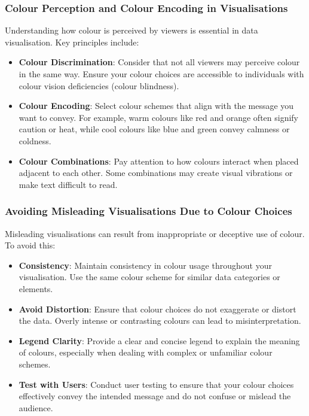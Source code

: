 \documentclass{article}\usepackage[]{graphicx}\usepackage[]{xcolor}
\begin{document}
\subsubsection{Colour Perception and Colour Encoding in Visualisations}
Understanding how colour is perceived by viewers is essential in data visualisation. Key principles include:
\begin{itemize}
    \item \textbf{Colour Discrimination}: Consider that not all viewers may perceive colour in the same way. Ensure your colour choices are accessible to individuals with colour vision deficiencies (colour blindness).
    \item \textbf{Colour Encoding}: Select colour schemes that align with the message you want to convey. For example, warm colours like red and orange often signify caution or heat, while cool colours like blue and green convey calmness or coldness.
    \item \textbf{Colour Combinations}: Pay attention to how colours interact when placed adjacent to each other. Some combinations may create visual vibrations or make text difficult to read.
\end{itemize}

\subsubsection{Avoiding Misleading Visualisations Due to Colour Choices}
Misleading visualisations can result from inappropriate or deceptive use of colour. To avoid this:
\begin{itemize}
    \item \textbf{Consistency}: Maintain consistency in colour usage throughout your visualisation. Use the same colour scheme for similar data categories or elements.
    \item \textbf{Avoid Distortion}: Ensure that colour choices do not exaggerate or distort the data. Overly intense or contrasting colours can lead to misinterpretation.
    \item \textbf{Legend Clarity}:  Provide a clear and concise legend to explain the meaning of colours, especially when dealing with complex or unfamiliar colour schemes. 
    \item \textbf{Test with Users}: Conduct user testing to ensure that your colour choices effectively convey the intended message and do not confuse or mislead the audience.
\end{itemize}
\end{document}
